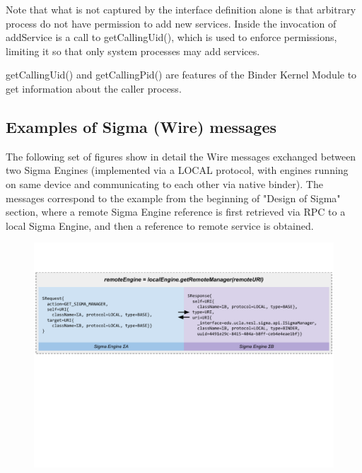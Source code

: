 \documentclass[prodmode]{acmlarge}
\begin{document}
Note that what is not captured by the interface definition alone is that arbitrary process do not have permission to add new services. Inside the invocation of addService is a call to getCallingUid(), which is used to enforce permissions, limiting it so that only system processes may add services.

getCallingUid() and getCallingPid() are features of the Binder Kernel Module to get information about the caller process.

\pagebreak[4]
\subsection{Examples of Sigma (Wire) messages}
\label{app:WireExchange}
The following set of figures show in detail the Wire messages exchanged between two Sigma Engines (implemented via a LOCAL protocol, with engines running on same device and communicating to each other via native binder). The messages correspond to the example from the beginning of "Design of Sigma" section, where a remote Sigma Engine reference is first retrieved via RPC to a local Sigma Engine, and then a reference to remote service is obtained.

\begin{figure}[h!]
\centering
\includegraphics[width=\textwidth]{drawings/WireExchange1.pdf}
\end{figure}
\end{document}
